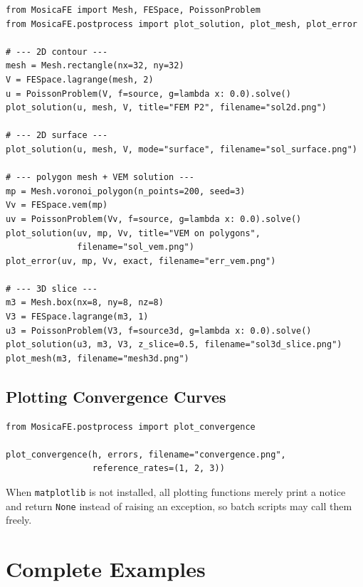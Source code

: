 \documentclass[11pt,oneside]{book}
\theoremstyle{definition}
\theoremstyle{plain}
\newenvironment{caution}{%
  \begin{tcolorbox}[colback=orange!5,colframe=orange!55,title=Caution,fonttitle=\bfseries]%
}{%
  \end{tcolorbox}%
}
\newcommand{\code}[1]{\texttt{#1}}
\begin{document}
\begin{lstlisting}[language=MosicaFE,caption={Plotting 2D and 3D solutions}]
from MosicaFE import Mesh, FESpace, PoissonProblem
from MosicaFE.postprocess import plot_solution, plot_mesh, plot_error

# --- 2D contour ---
mesh = Mesh.rectangle(nx=32, ny=32)
V = FESpace.lagrange(mesh, 2)
u = PoissonProblem(V, f=source, g=lambda x: 0.0).solve()
plot_solution(u, mesh, V, title="FEM P2", filename="sol2d.png")

# --- 2D surface ---
plot_solution(u, mesh, V, mode="surface", filename="sol_surface.png")

# --- polygon mesh + VEM solution ---
mp = Mesh.voronoi_polygon(n_points=200, seed=3)
Vv = FESpace.vem(mp)
uv = PoissonProblem(Vv, f=source, g=lambda x: 0.0).solve()
plot_solution(uv, mp, Vv, title="VEM on polygons",
              filename="sol_vem.png")
plot_error(uv, mp, Vv, exact, filename="err_vem.png")

# --- 3D slice ---
m3 = Mesh.box(nx=8, ny=8, nz=8)
V3 = FESpace.lagrange(m3, 1)
u3 = PoissonProblem(V3, f=source3d, g=lambda x: 0.0).solve()
plot_solution(u3, m3, V3, z_slice=0.5, filename="sol3d_slice.png")
plot_mesh(m3, filename="mesh3d.png")
\end{lstlisting}

\section{Plotting Convergence Curves}

\begin{lstlisting}[language=MosicaFE,caption={Convergence curves}]
from MosicaFE.postprocess import plot_convergence

plot_convergence(h, errors, filename="convergence.png",
                 reference_rates=(1, 2, 3))
\end{lstlisting}

\begin{caution}
When \code{matplotlib} is not installed, all plotting functions merely print a notice
and return \code{None} instead of raising an exception, so batch scripts may call
them freely.
\end{caution}

\chapter{Complete Examples}
\label{chap:examples}
\end{document}
